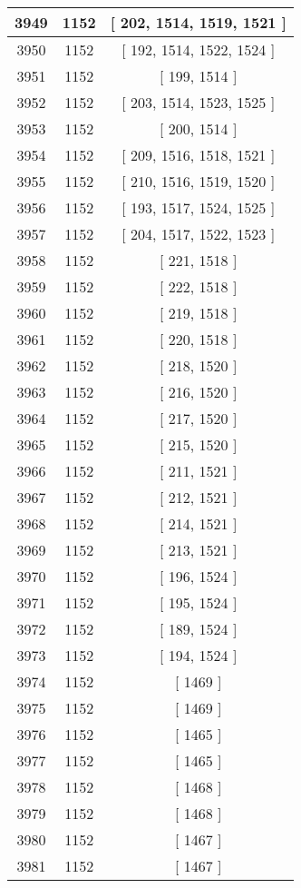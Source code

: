 \begin{center}
\begin{longtable}[H]{|| c c c ||}
\hline
3949 & 1152 & [ 202, 1514, 1519, 1521 ] \\ 
\hline
3950 & 1152 & [ 192, 1514, 1522, 1524 ] \\ 
\hline
3951 & 1152 & [ 199, 1514 ] \\ 
\hline
3952 & 1152 & [ 203, 1514, 1523, 1525 ] \\ 
\hline
3953 & 1152 & [ 200, 1514 ] \\ 
\hline
3954 & 1152 & [ 209, 1516, 1518, 1521 ] \\ 
\hline
3955 & 1152 & [ 210, 1516, 1519, 1520 ] \\ 
\hline
3956 & 1152 & [ 193, 1517, 1524, 1525 ] \\ 
\hline
3957 & 1152 & [ 204, 1517, 1522, 1523 ] \\ 
\hline
3958 & 1152 & [ 221, 1518 ] \\ 
\hline
3959 & 1152 & [ 222, 1518 ] \\ 
\hline
3960 & 1152 & [ 219, 1518 ] \\ 
\hline
3961 & 1152 & [ 220, 1518 ] \\ 
\hline
3962 & 1152 & [ 218, 1520 ] \\ 
\hline
3963 & 1152 & [ 216, 1520 ] \\ 
\hline
3964 & 1152 & [ 217, 1520 ] \\ 
\hline
3965 & 1152 & [ 215, 1520 ] \\ 
\hline
3966 & 1152 & [ 211, 1521 ] \\ 
\hline
3967 & 1152 & [ 212, 1521 ] \\ 
\hline
3968 & 1152 & [ 214, 1521 ] \\ 
\hline
3969 & 1152 & [ 213, 1521 ] \\ 
\hline
3970 & 1152 & [ 196, 1524 ] \\ 
\hline
3971 & 1152 & [ 195, 1524 ] \\ 
\hline
3972 & 1152 & [ 189, 1524 ] \\ 
\hline
3973 & 1152 & [ 194, 1524 ] \\ 
\hline
3974 & 1152 & [ 1469 ] \\ 
\hline
3975 & 1152 & [ 1469 ] \\ 
\hline
3976 & 1152 & [ 1465 ] \\ 
\hline
3977 & 1152 & [ 1465 ] \\ 
\hline
3978 & 1152 & [ 1468 ] \\ 
\hline
3979 & 1152 & [ 1468 ] \\ 
\hline
3980 & 1152 & [ 1467 ] \\ 
\hline
3981 & 1152 & [ 1467 ] \\ 

\end{longtable}
\end{center}
